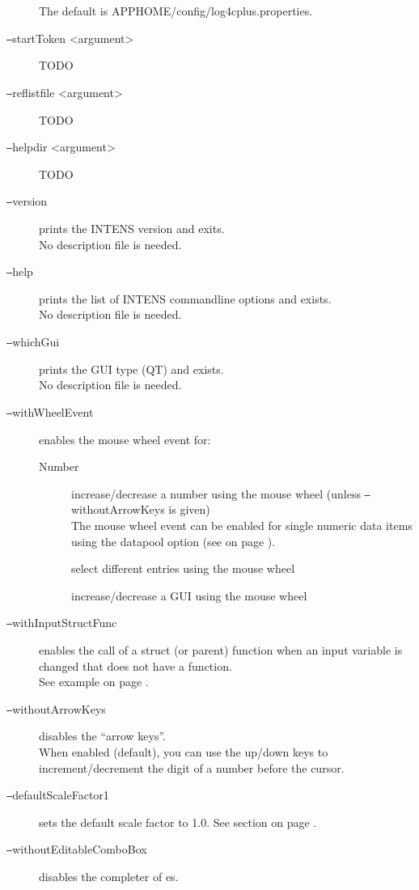 \begin{description}
  The default is APPHOME/config/log4cplus.properties.
%
\item[\texttt{--}startToken <argument>]
  TODO
%
\item[\texttt{--}reflistfile <argument>]
  TODO
%
\item[\texttt{--}helpdir <argument>]
  TODO
%
\item[\texttt{--}version] prints the INTENS version and exits. \\
  No description file is needed.
%
\item[\texttt{--}help] prints the list of INTENS commandline options and exists. \\
  No description file is needed.
%
\item[\texttt{--}whichGui] prints the GUI type (QT) and exists. \\
  No description file is needed.
%
\item[\texttt{--}withWheelEvent] enables the mouse wheel event for:
  \begin{description}
  \item[Number] increase/decrease a number using the mouse wheel
  (unless \texttt{--}withoutArrowKeys is given) \\
  The mouse wheel event can be enabled for single numeric data items using the datapool option \WHEELEVENT
  (see  on page \pageref{dia:dataitemmoreoption}).
  \item[\COMBOBOX] select different entries using the mouse wheel
  \item[\INDEX] increase/decrease a GUI \INDEX{} using the mouse wheel
  \end{description}
%
\item[\texttt{--}withInputStructFunc] enables the call of a struct (or parent) function
  when an input variable is changed that does not have a function. \\
  See example  on page \pageref{fuexample3}.
%
\item[\texttt{--}withoutArrowKeys] disables the ``arrow keys''. \\
  When enabled (default), you can use the up/down keys to increment/decrement
  the digit of a number before the cursor.
%
\item[\texttt{--}defaultScaleFactor1] sets the default scale factor to 1.0.
  See section  on page \pageref{sec:scale}.
%
\item[\texttt{--}withoutEditableComboBox] disables the completer of \COMBOBOX{}es. \\

\end{description}
